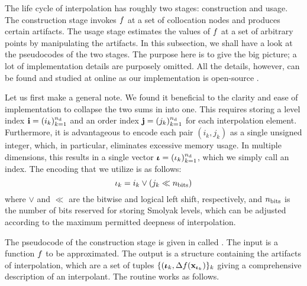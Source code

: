 The life cycle of interpolation has roughly two stages: construction and usage.
The construction stage invokes $f$ at a set of collocation nodes and produces
certain artifacts. The usage stage estimates the values of $f$ at a set of
arbitrary points by manipulating the artifacts. In this subsection, we shall
have a look at the pseudocodes of the two stages. The purpose here is to give
the big picture; a lot of implementation details are purposely omitted. All the
details, however, can be found and studied at online as our implementation is
open-source \cite{sources}.

Let us first make a general note. We found it beneficial to the clarity and ease
of implementation to collapse the two sums in  into one.
This requires storing a level index $\mathbf{i} = (i_k)_{k = 1}^{n_\text{d}}$ and an order
index $\mathbf{j} = (j_k)_{k = 1}^{n_\text{d}}$ for each interpolation element. Furthermore, it
is advantageous to encode each pair $(i_k, j_k)$ as a single unsigned integer,
which, in particular, eliminates excessive memory usage. In multiple dimensions,
this results in a single vector ${\bm{\iota}} = (\iota_k)_{k = 1}^{n_\text{d}}$, which we simply
call an index. The encoding that we utilize is as follows:
\[
  \iota_k = i_k \lor (j_k \ll n_\text{bits})
\]
where $\lor$ and $\ll$ are the bitwise  and logical left shift,
respectively, and $n_\text{bits}$ is the number of bits reserved for storing
Smolyak levels, which can be adjusted according to the maximum permitted
deepness of interpolation.


The pseudocode of the construction stage is given in  called
. The  input is a function $f$ to be
approximated. The  output is a structure containing the
artifacts of interpolation, which are a set of tuples $\{ ({\bm{\iota}}_k,
\Delta f(\mathbf{x}_{{\bm{\iota}}_k}) \}_k$ giving a comprehensive description of an
interpolant. The routine works as follows.

